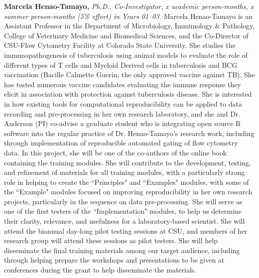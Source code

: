 \documentclass[pdftex,english,11pt,parskip=half]{scrartcl}
\begin{document}
\noindent \textbf{Marcela Henao-Tamayo,} \textit{Ph.D., Co-Investigator, x academic person-months, x summer person-months (5\% effort) in Years 01--03.} Marcela Henao-Tamayo is an Assistant Professor in the Department of Microbiology, Immunology \& Pathology, College of Veterinary Medicine and Biomedical Sciences, and the Co-Director of CSU-Flow Cytometry Facility at Colorado State University. She studies the immunopathogenesis of tuberculosis using animal models to evaluate the role of different types of T cells and Myeloid Derived cells in tuberculosis and BCG vaccination (Bacille Calmette Guerin, the only approved vaccine against TB). She has tested numerous vaccine candidates evaluating the immune response they elicit in association with protection against tuberculosis disease. She is interested in how existing tools for computational reproducibility can be applied to data recording and pre-processing in her own research laboratory, and she and Dr. Anderson (PI) co-advise a graduate student who is integrating open source R software into the regular practice of Dr. Henao-Tamayo's research work, including through implementation of reproducible automated gating of flow cytometry data. In this project, she will be one of the co-authors of the online book containing the training modules. She will contribute to the development, testing, and refinement of materials for all training modules, with a particularly strong role in helping to create the ``Principles" and ``Examples" modules, with some of the ``Example" modules focused on improving reproducibility in her own research projects, particularly in the sequence on data pre-processing. She will serve as one of the first testers of the ``Implementation" modules, to help us determine their clarity, relevance, and usefulness for a laboratory-based scientist. She will attend the biannual day-long pilot testing sessions at CSU, and members of her research group will attend these sessions as pilot testers. She will help disseminate the final training materials among our target audience, including through helping prepare the workshops and presentations to be given at conferences during the grant to help disseminate the materials. 
\end{document}
